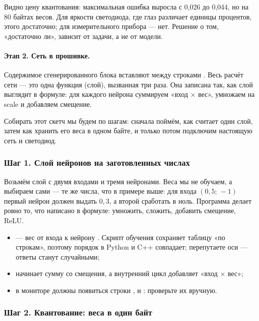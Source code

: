 Видно цену квантования: максимальная ошибка выросла с 0,026 до 0,044, но на 80 байтах весов.
Для яркости светодиода, где глаз различает единицы процентов, этого достаточно; для измерительного
прибора --- нет. Решение о том, «достаточно ли», зависит от задачи, а не от модели.

\paragraph{Этап 2. Сеть в прошивке.} Содержимое сгенерированного блока вставляют между строками
. Весь расчёт сети --- это одна функция
 (слой), вызванная три раза. Она записана так, как слой выглядит в формуле:
для каждого нейрона суммируем «вход $\times$ вес», умножаем на scale и добавляем смещение.

Собирать этот скетч мы будем по шагам: сначала поймём, как считает один слой, затем как хранить его
веса в одном байте, и только потом подключим настоящую сеть и светодиод.

\subsubsection{Шаг 1. Слой нейронов на заготовленных числах}

Возьмём слой с двумя входами и тремя нейронами. Веса мы не обучаем, а выбираем сами --- те же числа,
что в примере выше: для входа $(0{,}5;\,-1)$ первый нейрон должен выдать $0{,}3$, а второй сработать
в ноль. Программа делает ровно то, что написано в формуле: умножить, сложить, добавить смещение, ReLU.


\begin{itemize}[leftmargin=*]
  \item {} --- вес от входа  к нейрону . Скрипт обучения сохраняет таблицу
        «по строкам», поэтому порядок в Python и C++ совпадает; перепутаете оси --- ответы станут случайными;
  \item {} начинает сумму со смещения, а внутренний цикл добавляет «вход $\times$ вес»;
  \item в мониторе должны появиться строки ,  и : проверьте их вручную.
\end{itemize}

\subsubsection{Шаг 2. Квантование: веса в один байт}

